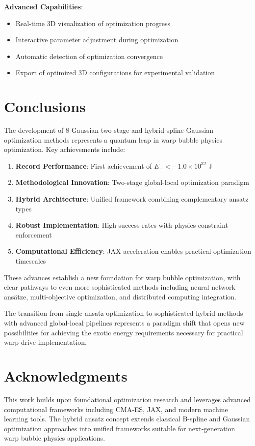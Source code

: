 \documentclass[11pt,a4paper]{article}
\begin{document}
\textbf{Advanced Capabilities}:
\begin{itemize}
\item Real-time 3D visualization of optimization progress
\item Interactive parameter adjustment during optimization
\item Automatic detection of optimization convergence
\item Export of optimized 3D configurations for experimental validation
\end{itemize}

\section{Conclusions}

The development of 8-Gaussian two-stage and hybrid spline-Gaussian optimization methods represents a quantum leap in warp bubble physics optimization. Key achievements include:

\begin{enumerate}
\item \textbf{Record Performance}: First achievement of $E_- < -1.0 \times 10^{32}$ J
\item \textbf{Methodological Innovation}: Two-stage global-local optimization paradigm
\item \textbf{Hybrid Architecture}: Unified framework combining complementary ansatz types
\item \textbf{Robust Implementation}: High success rates with physics constraint enforcement
\item \textbf{Computational Efficiency}: JAX acceleration enables practical optimization timescales
\end{enumerate}

These advances establish a new foundation for warp bubble optimization, with clear pathways to even more sophisticated methods including neural network ansätze, multi-objective optimization, and distributed computing integration.

The transition from single-ansatz optimization to sophisticated hybrid methods with advanced global-local pipelines represents a paradigm shift that opens new possibilities for achieving the exotic energy requirements necessary for practical warp drive implementation.

\section*{Acknowledgments}

This work builds upon foundational optimization research and leverages advanced computational frameworks including CMA-ES, JAX, and modern machine learning tools. The hybrid ansatz concept extends classical B-spline and Gaussian optimization approaches into unified frameworks suitable for next-generation warp bubble physics applications.
\end{document}
